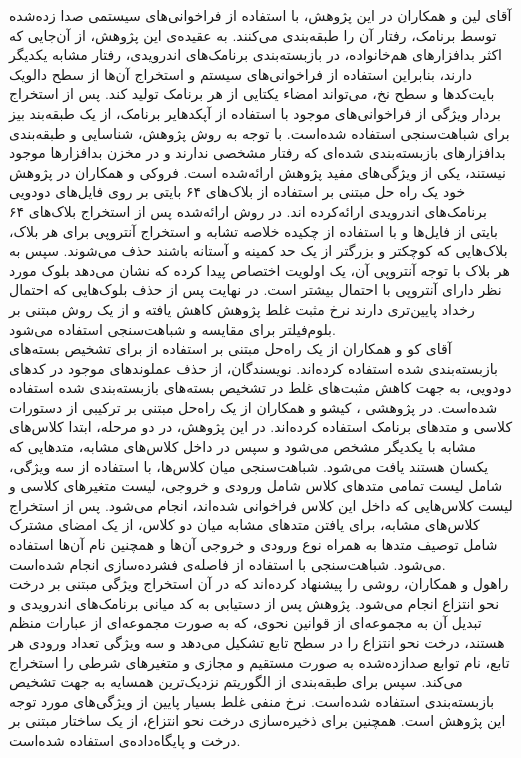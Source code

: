 آقای لین و همکاران در این پژوهش، با استفاده از فراخوانی‌های سیستمی‌ صدا زده‌شده توسط برنامک، رفتار آن را طبقه‌بندی می‌کنند. به عقیده‌ی این پژوهش، از آن‌جایی که اکثر بدافزار‌های هم‌خانواده، در بازبسته‌بندی برنامک‌های اندرویدی، رفتار مشابه یکدیگر دارند، بنابراین استفاده از فراخوانی‌های سیستم و استخراج آن‌ها از سطح دالویک بایت‌کد‌ها و سطح نخ‌، می‌تواند امضاء یکتایی از هر برنامک تولید کند. پس از استخراج بردار ویژگی‌ از فراخوانی‌های موجود با استفاده از آپکد‌هایر برنامک، از یک طبقه‌بند بیز برای شباهت‌سنجی استفاده شده‌است. با توجه به روش پژوهش، شناسایی و طبقه‌بندی بدافزار‌های بازبسته‌بندی شده‌ای که رفتار مشخصی ندارند و در مخزن بدافزار‌ها موجود نیستند، یکی از ویژگی‌های مفید پژوهش ارائه‌شده است. فروکی  و همکاران در پژوهش خود یک راه حل مبتنی بر استفاده از بلاک‌های ۶۴ بایتی بر روی فایل‌های دودویی برنامک‌های اندرویدی ارائه‌کرده ‌اند. در روش ارائه‌شده پس از استخراج بلاک‌های ۶۴ بایتی از فایل‌ها و با استفاده از چکیده‌ خلاصه تشابه و استخراج آنتروپی‌ برای هر بلاک، بلاک‌هایی که کوچکتر و بزرگتر از یک حد کمینه و آستانه باشند حذف می‌شوند. سپس به هر بلاک با توجه آنتروپی آن، یک اولویت اختصاص پیدا کرده که نشان می‌دهد بلوک مورد نظر دارای آنتروپی با احتمال بیشتر است. در نهایت پس از حذف بلوک‌هایی که احتمال رخداد پایین‌تری دارند نرخ مثبت غلط پژوهش کاهش یافته و از یک روش مبتنی بر بلوم‌فیلتر‌ برای مقایسه‌ و شباهت‌سنجی استفاده می‌شود.\\
آقای کو و همکاران از یک راه‌حل مبتنی بر استفاده از  برای تشخیص بسته‌های بازبسته‌بندی شده استفاده کرده‌اند. نویسندگان، از  حذف عملوند‌های‌ موجود در کد‌های دودویی، به‌ جهت کاهش مثبت‌های غلط در تشخیص بسته‌های بازبسته‌بندی شده استفاده شده‌است.
در پژوهشی ، کیشو و همکاران از یک راه‌حل مبتنی بر ترکیبی از دستورات کلاسی و متد‌های برنامک استفاده ‌کرده‌اند‌. در این پژوهش، در دو مرحله، ابتدا کلاس‌های مشابه‌ با یکدیگر مشخص می‌شود و سپس در داخل کلاس‌های مشابه، متد‌هایی که یکسان هستند یافت می‌شود. شباهت‌سنجی میان کلاس‌ها، با استفاده از سه ویژگی، شامل لیست تمامی‌ متد‌های کلاس شامل ورودی و خروجی، لیست متغیر‌های کلاسی و لیست کلاس‌هایی که داخل این کلاس فراخوانی ‌شده‌اند، انجام می‌شود. پس از استخراج کلاس‌های مشابه، برای یافتن متد‌های مشابه میان دو کلاس، از یک امضای مشترک شامل توصیف متد‌ها به همراه نوع ورودی و خروجی آن‌ها و همچنین نام آن‌ها استفاده می‌شود. شباهت‌سنجی با استفاده از فاصله‌ی فشرده‌سازی انجام شده‌است.\\
راهول و همکاران، روشی را پیشنهاد کرده‌اند که در آن استخراج ویژگی مبتنی بر درخت نحو انتزاع انجام می‌شود. پژوهش پس از دستیابی به کد میانی برنامک‌های اندرویدی و تبدیل آن به مجموعه‌ای از قوانین نحوی، که به صورت مجموعه‌ای از عبارات منظم‌ هستند، درخت نحو انتزاع را در سطح تابع تشکیل می‌دهد و سه ویژگی تعداد ورودی هر تابع، نام توابع صدازده‌شده به صورت مستقیم و مجازی‌ و متغیر‌های شرطی را استخراج می‌کند. سپس برای طبقه‌بندی از الگوریتم نزدیک‌ترین همسایه‌ به جهت تشخیص بازبسته‌بندی استفاده شده‌است. نرخ منفی غلط بسیار پایین از ویژگی‌های مورد توجه این پژوهش است. همچنین برای ذخیره‌سازی درخت نحو انتزاع، از یک ساختار مبتنی بر درخت  و پایگاه‌داده‌ی  استفاده شده‌است.\\
